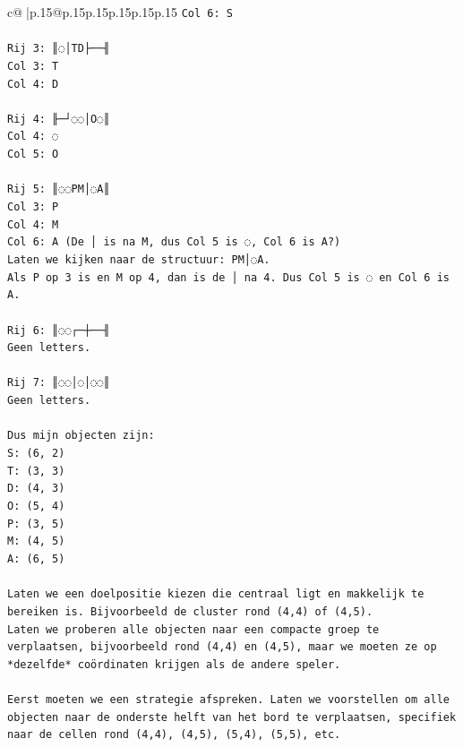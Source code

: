 \documentclass{article}
\begin{document}
{\begin{supertabular}{c@{$\;$}|p{.15\linewidth}@{}p{.15\linewidth}p{.15\linewidth}p{.15\linewidth}p{.15\linewidth}p{.15\linewidth}}
{{{\texttt{Col 6: S} \\
\\ 
\texttt{Rij 3: ║◌│TD├──╢} \\
\texttt{Col 3: T} \\
\texttt{Col 4: D} \\
\\ 
\texttt{Rij 4: ╟─┘◌◌│O◌║} \\
\texttt{Col 4: ◌} \\
\texttt{Col 5: O} \\
\\ 
\texttt{Rij 5: ║◌◌PM│◌A║} \\
\texttt{Col 3: P} \\
\texttt{Col 4: M} \\
\texttt{Col 6: A (De │ is na M, dus Col 5 is ◌, Col 6 is A?)} \\
\texttt{Laten we kijken naar de structuur: PM│◌A.} \\
\texttt{Als P op 3 is en M op 4, dan is de │ na 4. Dus Col 5 is ◌ en Col 6 is A.} \\
\\ 
\texttt{Rij 6: ║◌◌┌─┼──╢} \\
\texttt{Geen letters.} \\
\\ 
\texttt{Rij 7: ║◌◌│◌│◌◌║} \\
\texttt{Geen letters.} \\
\\ 
\texttt{Dus mijn objecten zijn:} \\
\texttt{S: (6, 2)} \\
\texttt{T: (3, 3)} \\
\texttt{D: (4, 3)} \\
\texttt{O: (5, 4)} \\
\texttt{P: (3, 5)} \\
\texttt{M: (4, 5)} \\
\texttt{A: (6, 5)} \\
\\ 
\texttt{Laten we een doelpositie kiezen die centraal ligt en makkelijk te bereiken is. Bijvoorbeeld de cluster rond (4,4) of (4,5).} \\
\texttt{Laten we proberen alle objecten naar een compacte groep te verplaatsen, bijvoorbeeld rond (4,4) en (4,5), maar we moeten ze op *dezelfde* coördinaten krijgen als de andere speler.} \\
\\ 
\texttt{Eerst moeten we een strategie afspreken. Laten we voorstellen om alle objecten naar de onderste helft van het bord te verplaatsen, specifiek naar de cellen rond (4,4), (4,5), (5,4), (5,5), etc.} \\
}}}
\end{supertabular}}
\end{document}
